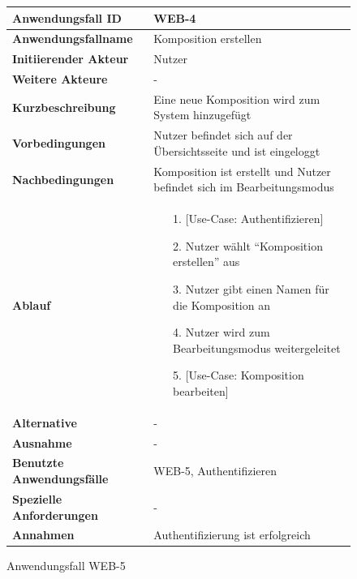 \begin{figure}[h]
	\centering
	\begin{tabularx}{\textwidth}{ X | X }
		\textbf{Anwendungsfall ID} & WEB-4 \\ \hline
		\textbf{Anwendungsfallname} & Komposition erstellen \\ \hline
		\textbf{Initiierender Akteur} & Nutzer \\ \hline
		\textbf{Weitere Akteure} & - \\ \hline
		\textbf{Kurzbeschreibung} & Eine neue Komposition wird zum System hinzugefügt \\ \hline
		\textbf{Vorbedingungen} & Nutzer befindet sich auf der Übersichtsseite und ist eingeloggt  \\ \hline
		\textbf{Nachbedingungen} & Komposition ist erstellt und Nutzer befindet sich im Bearbeitungsmodus \\ \hline
		\textbf{Ablauf} &
		\begin{enumerate}
			\item[1.]  [Use-Case: Authentifizieren]
			\item[2.]  Nutzer wählt ``Komposition erstellen'' aus
			\item[3.]  Nutzer gibt einen Namen für die Komposition an
			\item[4.]  Nutzer wird zum Bearbeitungsmodus weitergeleitet
			\item[5.] [Use-Case: Komposition bearbeiten]
		\end{enumerate} \\ \hline
		\textbf{Alternative} & - \\ \hline
		\textbf{Ausnahme} & - \\ \hline
		\textbf{Benutzte Anwendungsfälle} & WEB-5, Authentifizieren\\ \hline
		\textbf{Spezielle Anforderungen} & - \\ \hline
		\textbf{Annahmen} & Authentifizierung ist erfolgreich
	\end{tabularx}
	\caption{Anwendungsfall WEB-5}
	\label{fig:anwendungsfall-server-tabelle-web-4}
\end{figure}

